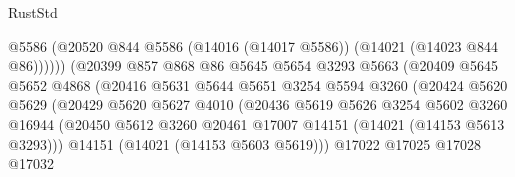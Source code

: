 \begin{lexlean}{RustStd}
\begin{coremodule}
                                        @5586
                                        (@20520
                                          @844
                                          @5586
                                          (@14016 (@14017 @5586))
                                          (@14021 (@14023 @844 @86))))))
                                  (@20399
                                    @857
                                    @868
                                    @86
                                    @5645
                                    @5654
                                    @3293
                                    @5663
                                    (@20409
                                      @5645
                                      @5652
                                      @4868
                                      (@20416
                                        @5631
                                        @5644
                                        @5651
                                        @3254
                                        @5594
                                        @3260
                                        (@20424
                                          @5620
                                          @5629
                                          (@20429
                                            @5620
                                            @5627
                                            @4010
                                            (@20436
                                              @5619
                                              @5626
                                              @3254
                                              @5602
                                              @3260
                                              @16944
                                              (@20450
                                                @5612
                                                @3260
                                                @20461
                                                @17007
                                                @14151
                                                (@14021 (@14153 @5613 @3293)))
                                              @14151
                                              (@14021 (@14153 @5603 @5619)))
                                            @17022
                                            @17025
                                            @17028
                                            @17032

\end{coremodule}
\end{lexlean}
